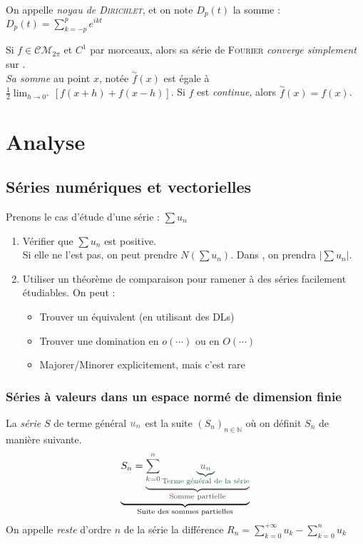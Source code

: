 \documentclass[11pt,a4paper,fleqn,pdftex]{report}
\begin{document}
\begin{dfn}
On appelle \emph{noyau de \textsc{Dirichlet}}, et on note $D_p(t)$ la somme : $D_p(t)=\sum_{k=-p}^p e^{ikt}$
\end{dfn}
\begin{itheorem}
Si $f \in \mathcal{CM}_{2\pi}$ et $C^1$ par morceaux, alors sa série de \textsc{Fourier} \emph{converge simplement} sur \Reel{}. \\
\emph{Sa somme} au point $x$, notée $\overset{\sim}{f}(x)$ est égale à $\frac{1}{2}\lim_{h\to 0^+}[f(x+h) + f(x-h)]$. Si $f$ est \emph{continue}, alors $\overset{\sim}{f}(x) = f(x)$.
\end{itheorem}
\part{Analyse}
\chapter{Séries numériques et vectorielles} %
\label{cha:series}
\begin{methode}
Prenons le cas d'étude d'une série : $ \sum u_n$
\begin{enumerate}
    \item Vérifier que $\sum u_n$ est positive. \\ Si elle ne l'est pas, on peut prendre $N(\sum u_n)$. Dans \Reel{}, on prendra $\left| \sum u_n \right|$.
    \item Utiliser un théorème de comparaison pour ramener à des séries facilement étudiables. On peut : 
    \begin{itemize}
        \item Trouver un équivalent (en utilisant des \glspl{DL})
        \item Trouver une domination en $o(\cdots)$ ou en $O(\cdots)$
        \item Majorer/Minorer explicitement, mais c'est rare
    \end{itemize}
\end{enumerate}
\end{methode}
\section{Séries à valeurs dans un espace normé de dimension finie}
\begin{dfn}
La \emph{série} $S$ de terme général $\color{couleurFonce!90} u_n$ est la suite $\left( S_n \right)_{n\in\mathbb{N}}$ où on définit $S_n$ de manière suivante.
    \begin{equation}
    \underbrace{S_n = \color{couleurNoirClair} \underbrace{\sum_{k=0}^{n} \color{couleurFonce!90}\underbrace{u_n}_{\text{Terme général de la série}}}_{\text{Somme partielle}}}_{\text{Suite des sommes partielles}}
    \end{equation}
    On appelle \emph{reste} d'ordre $n$ de la série la différence $R_n = \sum_{k=0}^{+\infty} u_k - \sum_{k=0}^{n} u_k$
\end{dfn}
\end{document}
